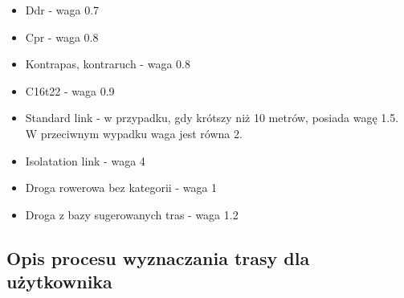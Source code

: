 \begin{itemize}
\item Ddr - waga 0.7
\item Cpr - waga 0.8
\item Kontrapas, kontraruch - waga 0.8
\item C16t22 - waga 0.9
\item Standard link - w przypadku, gdy krótszy niż 10 metrów, posiada wagę 1.5. W przeciwnym wypadku waga jest równa 2.
\item Isolatation link - waga 4
\item Droga rowerowa bez kategorii - waga 1
\item Droga z bazy sugerowanych tras - waga 1.2
\end{itemize}

\subsection{Opis procesu wyznaczania trasy dla użytkownika}

